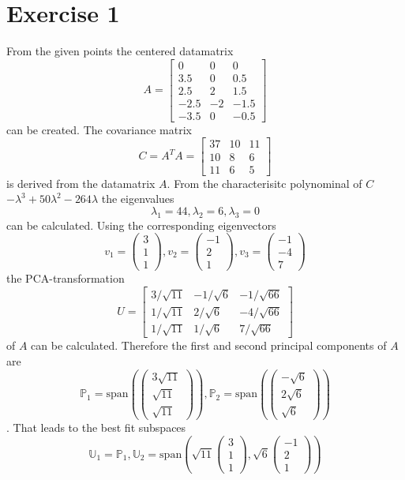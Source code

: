 \section*{Exercise 1}
From the given points the centered datamatrix \[A = \left[\begin{matrix}
0&0&0\\3.5&0&0.5\\2.5&2&1.5\\-2.5&-2&-1.5\\-3.5&0&-0.5
\end{matrix}\right]\] can be created.
The covariance matrix \[C=A^TA = \left[\begin{matrix}
37&10&11\\10&8&6\\11&6&5
\end{matrix}\right]\] is derived from the datamatrix $A$.
From the characterisitc polynominal of $C$ $-\lambda^3+50\lambda^2-264\lambda$ the eigenvalues \[\lambda_1 = 44, \lambda_2 = 6, \lambda_3 = 0\] can be calculated.
Using the corresponding eigenvectors \[v_1 = \left(\begin{matrix}
3\\1\\1
\end{matrix}\right),v_2=\left(\begin{matrix}
-1\\2\\1
\end{matrix}\right), v_3 = \left(\begin{matrix}
-1\\-4\\7
\end{matrix}\right)\]
the PCA-transformation \[U= \left[\begin{matrix}3/ \sqrt{11} & -1/\sqrt{6} & -1/\sqrt{66}\\1/\sqrt{11}&2/\sqrt{6}&-4/\sqrt{66} \\1/ \sqrt{11} & 1/\sqrt{6} & 7/\sqrt{66} \end{matrix}\right]\] of $A$ can be calculated.
Therefore the first and second principal components of $A$ are 
\[\mathbb{P}_1 = \text{span}\left(\left(\begin{matrix}
3\sqrt{11}\\\sqrt{11}\\\sqrt{11}
\end{matrix}\right)\right),\mathbb{P}_2= \text{span}\left(\left(\begin{matrix}
-\sqrt{6}\\2\sqrt{6}\\\sqrt{6}
\end{matrix}\right)\right)\].
That leads to the best fit subspaces \[\mathbb{U}_1 = \mathbb{P}_1, \mathbb{U}_2 = \text{span}\left(\sqrt{11}\left(\begin{matrix}
3\\1\\1
\end{matrix}\right),\sqrt{6}\left(\begin{matrix}
-1\\2\\1
\end{matrix}\right)\right)\]